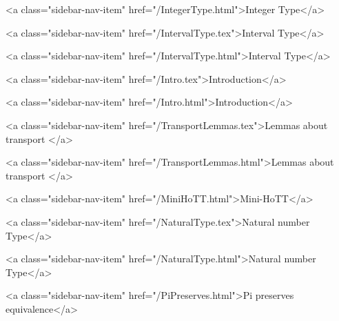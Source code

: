       
        
          <a class="sidebar-nav-item" href="/IntegerType.html">Integer Type</a>
        
      
    
      
        
          <a class="sidebar-nav-item" href="/IntervalType.tex">Interval Type</a>
        
      
    
      
        
          <a class="sidebar-nav-item" href="/IntervalType.html">Interval Type</a>
        
      
    
      
        
          <a class="sidebar-nav-item" href="/Intro.tex">Introduction</a>
        
      
    
      
        
          <a class="sidebar-nav-item" href="/Intro.html">Introduction</a>
        
      
    
      
        
          <a class="sidebar-nav-item" href="/TransportLemmas.tex">Lemmas about transport </a>
        
      
    
      
        
          <a class="sidebar-nav-item" href="/TransportLemmas.html">Lemmas about transport </a>
        
      
    
      
        
          <a class="sidebar-nav-item" href="/MiniHoTT.html">Mini-HoTT</a>
        
      
    
      
        
          <a class="sidebar-nav-item" href="/NaturalType.tex">Natural number Type</a>
        
      
    
      
        
          <a class="sidebar-nav-item" href="/NaturalType.html">Natural number Type</a>
        
      
    
      
        
          <a class="sidebar-nav-item" href="/PiPreserves.html">Pi preserves equivalence</a>
        
      
    
